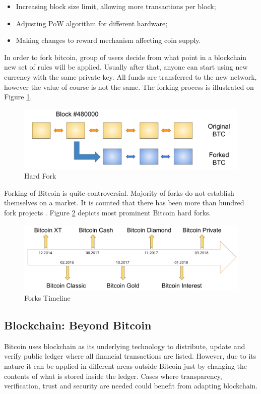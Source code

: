 \documentclass[conference,compsoc]{IEEEtran}
\begin{document}
\begin{itemize}
    \item Increasing block size limit, allowing more transactions per block;
    \item Adjusting PoW algorithm for different hardware;
    \item Making changes to reward mechanism affecting coin supply.
\end{itemize}

In order to fork bitcoin, group of users decide from what point in a blockchain new set of rules will be applied. 
Usually after that, anyone can start using new currency with the same private key. 
All funds are transferred to the new network, however the value of course is not the same. 
The forking process is illustrated on Figure \ref{fig:fig9}.

\begin{figure}[h]
  \centering
  \includegraphics[width=.45\textwidth]{graphics/fork.png}
  \caption{Hard Fork}
  \label{fig:fig9}
\end{figure}

Forking of Bitcoin is quite controversial. 
Majority of forks do not establish themselves on a market. 
It is counted that there has been more than hundred fork projects \cite{forks}.
Figure \ref{fig:fig10} depicts most prominent Bitcoin hard forks. 

\begin{figure}[h]
  \centering
  \includegraphics[width=.45\textwidth]{graphics/timeline.png}
  \caption{Forks Timeline}
  \label{fig:fig10}
\end{figure}


\subsection{Blockchain: Beyond Bitcoin}
Bitcoin uses blockchain as its underlying technology to distribute, update and verify public ledger where all financial transactions are listed. 
However, due to its nature it can be applied in different areas outside Bitcoin just by changing the contents of what is stored inside the ledger. 
Cases where transparency, verification, trust and security are needed could benefit from adapting blockchain.
\end{document}
